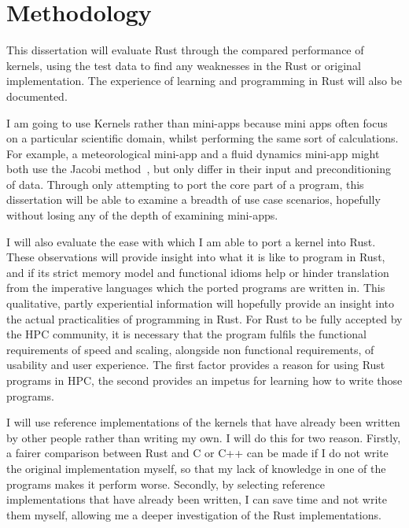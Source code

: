 \chapter{Methodology}\label{sec:meth}
This dissertation will evaluate Rust through the compared performance of  kernels, using the test data to find any weaknesses in the Rust or original implementation. The experience of learning and programming in Rust will also be documented.

I am going to use Kernels rather than mini-apps because mini apps often focus on a particular scientific domain, whilst performing the same sort of calculations. For example, a meteorological mini-app and a fluid dynamics mini-app might both use the Jacobi method~\cite{muller2014, schippers1982}, but only differ in their input and preconditioning of data.
Through only attempting to port the core part of a program, this dissertation will be able to examine a breadth of use case scenarios, hopefully without losing any of the depth of examining mini-apps.

I will also evaluate the ease with which I am able to port a kernel into Rust. These observations will provide insight into what it is like to program in Rust, and if its strict memory model and functional idioms help or hinder translation from the imperative languages which the ported programs are written in. This qualitative, partly experiential information will hopefully provide an insight into the actual practicalities of programming in Rust. For Rust to be fully accepted by the HPC community, it is necessary that the program fulfils the functional requirements of speed and scaling, alongside non functional requirements, of usability and user experience. The first factor provides a reason for using Rust programs in HPC, the second provides an impetus for learning how to write those programs.

I will use reference implementations of the kernels that have already been written by other people rather than writing my own. I will do this for two reason. Firstly, a fairer comparison between Rust and C or C++ can be made if I do not write the original implementation myself, so that my lack of knowledge in one of the programs makes it perform worse. Secondly, by selecting reference implementations that have already been written, I can save time and not write them myself, allowing me a deeper investigation of the Rust implementations.

